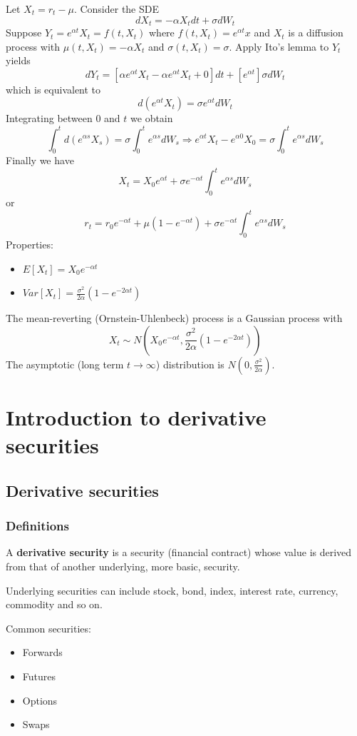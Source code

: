 \documentclass[11pt,a4paper]{book}
\theoremstyle{definition}\newtheorem{definition}{Definition}
\theoremstyle{definition}\newtheorem{fact}{Fact}
\theoremstyle{definition}\newtheorem{remark}{Remark}
\theoremstyle{definition}\newtheorem{ex}{Ex.}
\theoremstyle{definition}\newtheorem{project}{Project}
\theoremstyle{definition}\newtheorem{problem}{Problem}
\theoremstyle{definition}\newtheorem{example}{Example}
\numberwithin{theorem}{section}
\numberwithin{corollary}{chapter}
\numberwithin{assumption}{chapter}
\numberwithin{definition}{chapter}
\numberwithin{prop}{chapter}
\numberwithin{notation}{chapter}
\numberwithin{problem}{chapter}
\numberwithin{example}{chapter}
\numberwithin{fact}{chapter}
\numberwithin{ex}{chapter}
\begin{document}
Let $X_t = r_t-\mu$. Consider the SDE
\begin{equation}
dX_t = -\alpha X_t dt + \sigma dW_t
\end{equation}
Suppose $Y_t = e^{\alpha t}X_t = f(t,X_t)$ where $f(t,X_t) = e^{\alpha t}x$ and $X_t$ is a diffusion process with $\mu(t,X_t) = -\alpha X_t$ and $\sigma(t,X_t) = \sigma$. Apply Ito's lemma to $Y_t$ yields
$$ dY_t = [\alpha e^{\alpha t}X_t-\alpha e^{\alpha t}X_t+0]dt + [e^{\alpha t}]\sigma dW_t $$
which is equivalent to
$$ d(e^{\alpha t} X_t) = \sigma e^{\alpha t} dW_t $$
Integrating between 0 and $t$ we obtain
$$\int_0^t d(e^{\alpha s}X_s) = \sigma \int_0^t e^{\alpha s} dW_s \Longrightarrow e^{\alpha t}X_t - e^{\alpha 0}X_0 = \sigma \int_0^t e^{\alpha s} dW_s $$
Finally we have
$$ X_t = X_0e^{\alpha t} + \sigma e^{-\alpha t} \int_0^t e^{\alpha s} dW_s $$
or
$$ r_t = r_0e^{-\alpha t} + \mu(1-e^{-\alpha t}) + \sigma e^{-\alpha t} \int_0^t e^{\alpha s} dW_s $$
Properties:
\begin{itemize}
\item $E[X_t] = X_0 e^{-\alpha t}$
\item $Var[X_t] = \frac{\sigma^2}{2\alpha}(1-e^{-2\alpha t})$
\end{itemize}
The mean-reverting (Ornstein-Uhlenbeck) process is a Gaussian process with
$$X_t \sim N(X_0e^{-\alpha t}, \frac{\sigma^2}{2\alpha}(1-e^{-2\alpha t}))$$
The asymptotic (long term $t \rightarrow \infty$) distribution is $N(0,\frac{\sigma^2}{2\alpha})$.


\chapter{Introduction to derivative securities}

\section{Derivative securities}

\subsection{Definitions}
A \textbf{derivative security} is a security (financial contract) whose value is derived from that of another underlying, more basic, security.

Underlying securities can include stock, bond, index, interest rate, currency, commodity and so on.

Common securities:
\begin{itemize}
\item Forwards
\item Futures
\item Options
\item Swaps
\end{itemize}
\end{document}
